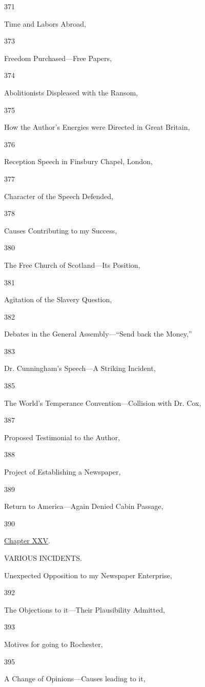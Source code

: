 371

Time and Labors Abroad,

373

Freedom Purchased---Free Papers,

374

Abolitionists Displeased with the Ransom,

375

How the Author's Energies were Directed in Great Britain,

376

Reception Speech in Finsbury Chapel, London,

377

Character of the Speech Defended,

378

Causes Contributing to my Success,

380

The Free Church of Scotland---Its Position,

381

Agitation of the Slavery Question,

382

Debates in the General Assembly---``Send back the Money,''

383

Dr. Cunningham's Speech---A Striking Incident,

385

The World's Temperance Convention---Collision with Dr. Cox,

387

Proposed Testimonial to the Author,

388

Project of Establishing a Newspaper,

389

Return to America---Again Denied Cabin Passage,

390

\href{/wiki/My_Bondage_and_My_Freedom_(1855)/Chapter_XXV}{Chapter XXV}.

VARIOUS INCIDENTS.

Unexpected Opposition to my Newspaper Enterprise,

392

The Objections to it---Their Plausibility Admitted,

393

Motives for going to Rochester,

395

A Change of Opinions---Causes leading to it,

